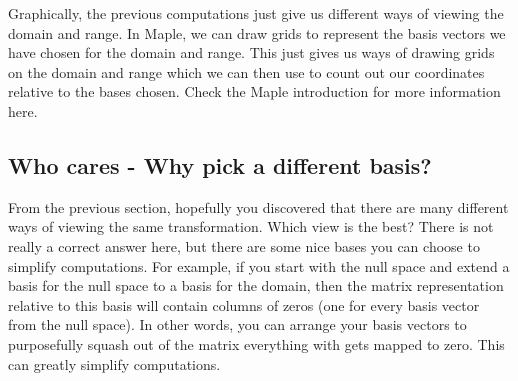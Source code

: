 \documentclass[10pt]{article}
\theoremstyle{plain}
\theoremstyle{box}
\begin{document}
Graphically, the previous computations just give us different ways of viewing the domain and range. In Maple, we can draw grids to represent the basis vectors we have chosen for the domain and range. This just gives us ways of drawing grids on the domain and range which we can then use to count out our coordinates relative to the bases chosen. Check the Maple introduction for more information here.


\subsection{Who cares - Why pick a different basis?}
From the previous section, hopefully you discovered that there are many different ways of viewing the same transformation.  Which view is the best? There is not really a correct answer here, but there are some nice bases you can choose to simplify computations.  For example, if you start with the null space and extend a basis for the null space to a basis for the domain, then the matrix representation relative to this basis will contain columns of zeros (one for every basis vector from the null space). In other words, you can arrange your basis vectors to purposefully squash out of the matrix everything with gets mapped to zero.  This can greatly simplify computations.
\end{document}

